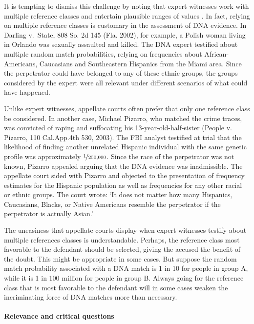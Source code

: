 \documentclass{article}
\begin{document}
It is tempting to dismiss this challenge by noting that expert witnesses work with multiple reference classes and entertain plausible ranges of values \citep{nance2007}. 
In fact, relying on multiple reference classes is customary in the assessment of DNA evidence.
 In Darling v.\ State, 808 So. 2d 145 (Fla. 2002), for example, a Polish woman living in Orlando was sexually assaulted and killed. The DNA expert testified about multiple random match probabilities, relying on frequencies about African-Americans, Caucasians and Southeastern Hispanics from the Miami area. Since the perpetrator could have belonged to any of these ethnic groups, the groups considered by the expert were all relevant under different scenarios of what could have happened. 
  
 Unlike expert witnesses, appellate courts often prefer that only one reference class be considered.  
    In another case, Michael Pizarro, who matched the crime traces, was convicted of raping and suffocating his 13-year-old-half-sister (People v.\,Pizarro, %
 110 Cal.App.4th 530, 2003). %
The FBI analyst testified at trial that the likelihood of finding another unrelated Hispanic individual with the same genetic profile was approximately $\nicefrac{1}{250,000}$. Since the race of the perpetrator was not known, Pizarro appealed arguing that the DNA evidence was inadmissible. 
The appellate court sided with Pizarro and objected to the presentation of frequency estimates for the Hispanic population as well as frequencies for any other racial or ethnic groups. The court wrote: `It does not matter how many Hispanics, Caucasians, Blacks, or Native Americans resemble the perpetrator if the perpetrator is actually Asian.' %

The uneasiness that
appellate courts display when expert witnesses testify about multiple references classes is understandable. 
Perhaps, the reference class most favorable to the defendant should be selected, giving the accused the benefit of the doubt. This might be appropriate in some cases. But suppose the random match probability associated with a DNA match is 1 in 10 for people in group A, while it is 1 in 100 million for people in group B. Always going for the reference class that is most favorable to the defendant will in some cases weaken the incriminating force of DNA matches more than necessary. 





\paragraph{Relevance and critical questions}
\end{document}
